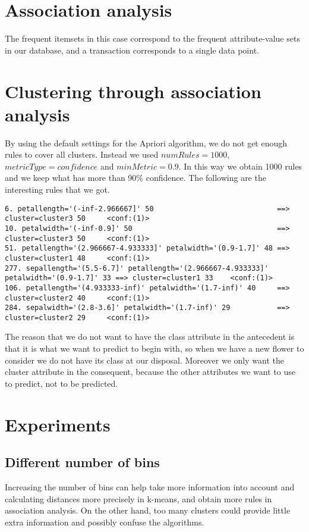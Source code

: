 \documentclass[]{article}
\begin{document}
\section{Association analysis}
The frequent itemsets in this case correspond to the frequent attribute-value sets in our database, and a transaction corresponds to a single data point.

\section{Clustering through association analysis}
By using the default settings for the Apriori algorithm, we do not get enough rules to cover all clusters. Instead we used $numRules=1000$, $metricType=confidence$ and $minMetric=0.9$. In this way we obtain 1000 rules and we keep what has more than 90\% confidence. The following are the interesting rules that we got.
\begin{lstlisting}
6. petallength='(-inf-2.966667]' 50 							==> cluster=cluster3 50 	<conf:(1)> 
10. petalwidth='(-inf-0.9]' 50 									==> cluster=cluster3 50  	<conf:(1)> 
51. petallength='(2.966667-4.933333]' petalwidth='(0.9-1.7]' 48 ==> cluster=cluster1 48  	<conf:(1)> 
277. sepallength='(5.5-6.7]' petallength='(2.966667-4.933333]' petalwidth='(0.9-1.7]' 33 ==> cluster=cluster1 33    <conf:(1)> 
106. petallength='(4.933333-inf)' petalwidth='(1.7-inf)' 40 	==> cluster=cluster2 40     <conf:(1)> 
284. sepalwidth='(2.8-3.6]' petalwidth='(1.7-inf)' 29 			==> cluster=cluster2 29   	<conf:(1)> 
\end{lstlisting}
The reason that we do not want to have the class attribute in the antecedent is that it is what we want to predict to begin with, so when we have a new flower to consider we do not have its class at our disposal. Moreover we only want the cluster attribute in the consequent, because the other attributes we want to use to predict, not to be predicted.

\section{Experiments}

\subsection{Different number of bins}
Increasing the number of bins can help take more information into account and calculating distances more precisely in k-means, and obtain more rules in association analysis. On the other hand, too many clusters could provide little extra information and possibly confuse the algorithms. 
\end{document}
